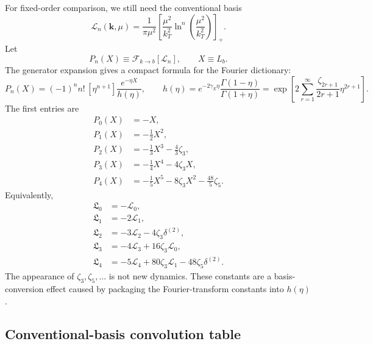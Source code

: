 \documentclass[11pt]{article}
\newcommand{\bk}{\bm{k}}
\newcommand{\deltaT}{\delta^{(2)}}
\begin{document}
For fixed-order comparison, we still need the conventional basis
\begin{equation}
  \mathcal L_n(\bk,\mu)
  =\frac{1}{\pi\mu^2}\left[\frac{\mu^2}{k_T^2}
  \ln^n\!\left(\frac{\mu^2}{k_T^2}\right)\right]_+.
\end{equation}
Let
\begin{equation}
  P_n(X)\equiv\mathcal F_{k\to b}[\mathcal L_n],
  \qquad X\equiv L_b.
\end{equation}
The generator expansion gives a compact formula for the Fourier dictionary:
\begin{equation}
  P_n(X)
  =(-1)^n n!\,[\eta^{n+1}]
  \frac{e^{-\eta X}}{h(\eta)},
  \qquad
  h(\eta)=e^{-2\gamma_E\eta}\frac{\Gamma(1-\eta)}{\Gamma(1+\eta)}
  =\exp\!\left[2\sum_{r=1}^{\infty}\frac{\zeta_{2r+1}}{2r+1}\eta^{2r+1}\right].
  \label{eq:Pn-generator-formula}
\end{equation}
The first entries are
\begin{align}
  P_0(X)&=-X,
  \label{eq:P0-v08}
  \\
  P_1(X)&=-\frac{1}{2}X^2,
  \label{eq:P1-v08}
  \\
  P_2(X)&=-\frac{1}{3}X^3-\frac{4}{3}\zeta_3,
  \label{eq:P2-v08}
  \\
  P_3(X)&=-\frac{1}{4}X^4-4\zeta_3X,
  \label{eq:P3-v08}
  \\
  P_4(X)&=-\frac{1}{5}X^5-8\zeta_3X^2-\frac{48}{5}\zeta_5.
  \label{eq:P4-v08}
\end{align}
Equivalently,
\begin{align}
  \mathfrak L_0&=-\mathcal L_0,
  \\
  \mathfrak L_1&=-2\mathcal L_1,
  \\
  \mathfrak L_2&=-3\mathcal L_2-4\zeta_3\deltaT,
  \\
  \mathfrak L_3&=-4\mathcal L_3+16\zeta_3\mathcal L_0,
  \\
  \mathfrak L_4&=-5\mathcal L_4+80\zeta_3\mathcal L_1-48\zeta_5\deltaT.
  \label{eq:frak-to-L-v08}
\end{align}
The appearance of $\zeta_3,\zeta_5,\ldots$ is not new dynamics. These constants are a
basis-conversion effect caused by packaging the Fourier-transform constants into
$h(\eta)$.

\subsection{Conventional-basis convolution table}
\end{document}
